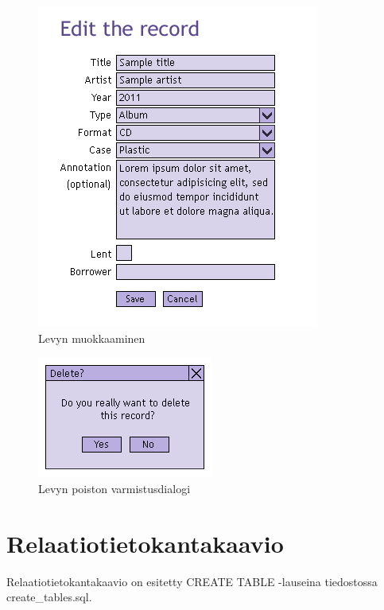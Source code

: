 \documentclass[a4paper,12pt]{report}
\begin{document}
\begin{figure}[H]
\begin{center}
\includegraphics[]{editpage}
\end{center}
\caption{Levyn muokkaaminen}
\end{figure}

\begin{figure}[H]
\begin{center}
\includegraphics[]{delete}
\end{center}
\caption{Levyn poiston varmistusdialogi}
\end{figure}

\section{Relaatiotietokantakaavio}

Relaatiotietokantakaavio on esitetty CREATE TABLE -lauseina tiedostossa create\_tables.sql.
\end{document}

